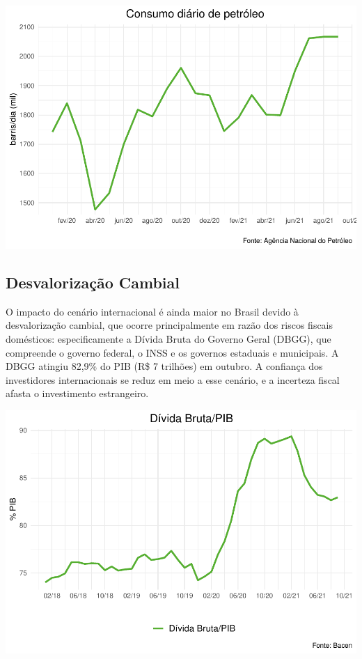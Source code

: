 \documentclass[100,a4paperpaper,]{article}
\begin{document}
\includegraphics{inflacao_files/figure-latex/Consumo Petroleo-1.pdf}
\newpage

\subsection{Desvalorização Cambial} 
 \vspace{0,5cm}

O impacto do cenário internacional é ainda maior no Brasil devido à
desvalorização cambial, que ocorre principalmente em razão dos riscos
fiscais domésticos: especificamente a Dívida Bruta do Governo Geral
(DBGG), que compreende o governo federal, o INSS e os governos estaduais
e municipais. A DBGG atingiu 82,9\% do PIB (R\$ 7 trilhões) em outubro.
A confiança dos investidores internacionais se reduz em meio a esse
cenário, e a incerteza fiscal afasta o investimento estrangeiro.

\includegraphics{inflacao_files/figure-latex/Divida Bruta/PIB-1.pdf}
\newpage
\end{document}
